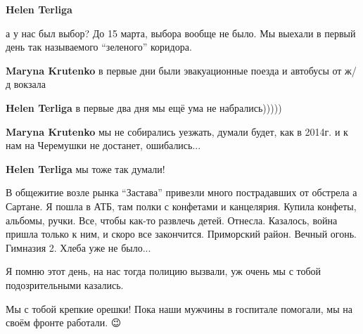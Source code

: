 \begin{itemize} %
\textbf{Helen Terliga} 

а у нас был выбор? До 15 марта, выбора вообще не было. Мы выехали в первый день
так называемого \enquote{зеленого} коридора.

\textbf{Maryna Krutenko} в первые дни были эвакуационные поезда и автобусы от ж/д вокзала

\textbf{Helen Terliga} в первые два дня мы ещё ума не набрались)))))

\textbf{Maryna Krutenko} мы не собирались уезжать, думали будет, как в 2014г. и к нам на Черемушки не достанет, ошибались...

\textbf{Helen Terliga} мы тоже так думали!

\end{itemize} %


В общежитие возле рынка \enquote{Застава} привезли много пострадавших от обстрела а
Сартане. Я пошла в АТБ, там полки с конфетами и канцелярия. Купила конфеты,
альбомы, ручки. Все, чтобы как-то развлечь детей. Отнесла. Казалось, война
пришла только к ним, и скоро все закончится. Приморский район. Вечный огонь.
Гимназия 2. Хлеба уже не было...


Я помню этот день, на нас тогда полицию вызвали, уж очень мы с тобой подозрительными казались.


Мы с тобой крепкие орешки! Пока наши мужчины в госпитале помогали, мы на своём фронте работали. 😉
